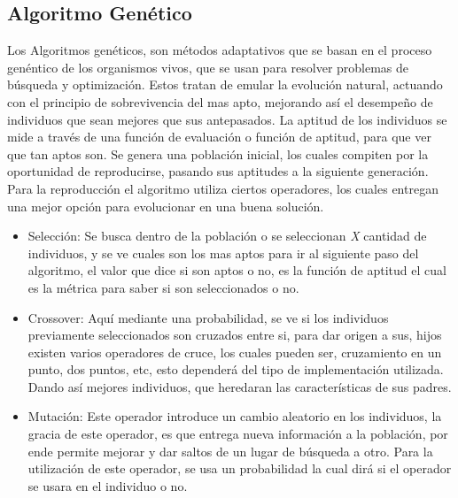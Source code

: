 \documentclass[letter, 10pt]{article}
\begin{document}
\subsection{Algoritmo Gen\'etico}
Los Algoritmos gen\'eticos, son m\'etodos adaptativos que se basan en el proceso gen\'entico de los organismos vivos, que se usan para resolver 
problemas de b\'usqueda y optimizaci\'on. Estos tratan de emular la evoluci\'on natural, actuando con el principio de sobrevivencia del mas apto, 
mejorando as\'i el desempe\~no de individuos que sean mejores que sus antepasados. La aptitud de los individuos se mide a trav\'es de una funci\'on de
evaluaci\'on o funci\'on de aptitud, para que ver que tan aptos son. Se genera una poblaci\'on inicial, los cuales compiten por la oportunidad de
reproducirse, pasando sus aptitudes a la siguiente generaci\'on. Para la reproducci\'on el algoritmo utiliza ciertos operadores, los cuales entregan 
una mejor opci\'on para evolucionar en una buena soluci\'on.
\begin{itemize}
 \item Selecci\'on: Se busca dentro de la poblaci\'on o se seleccionan \emph{X} cantidad de individuos, y se ve cuales son los mas aptos para ir al 
 siguiente paso del algoritmo, el valor que dice si son aptos o no, es la funci\'on de aptitud el cual es la m\'etrica para saber si 
 son seleccionados o no.
 \item Crossover: Aqu\'i mediante una probabilidad, se ve si los individuos previamente seleccionados son cruzados entre si, para dar origen a sus,
 hijos existen varios operadores de cruce, los cuales pueden ser, cruzamiento en un punto, dos puntos, etc, esto depender\'a del 
 tipo de implementaci\'on utilizada. Dando as\'i mejores individuos, que heredaran las caracter\'isticas de sus padres.
 \item Mutaci\'on: Este operador introduce un cambio aleatorio en los individuos, la gracia de este operador, es que entrega nueva informaci\'on a la 
 poblaci\'on, por ende permite mejorar y dar saltos de un lugar de b\'usqueda a otro. Para la utilizaci\'on de este operador, se usa un probabilidad 
 la cual dir\'a si el operador se usara en el individuo o no.
\end{itemize}
\end{document}
